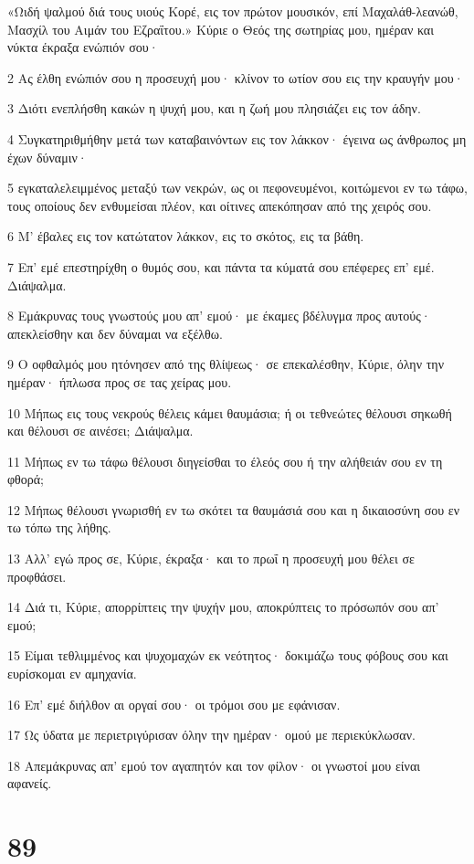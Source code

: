 \par «Ωιδή ψαλμού διά τους υιούς Κορέ, εις τον πρώτον μουσικόν, επί Μαχαλάθ-λεανώθ, Μασχίλ του Αιμάν του Εζραΐτου.» Κύριε ο Θεός της σωτηρίας μου, ημέραν και νύκτα έκραξα ενώπιόν σου·
\par 2 Ας έλθη ενώπιόν σου η προσευχή μου· κλίνον το ωτίον σου εις την κραυγήν μου·
\par 3 Διότι ενεπλήσθη κακών η ψυχή μου, και η ζωή μου πλησιάζει εις τον άδην.
\par 4 Συγκατηριθμήθην μετά των καταβαινόντων εις τον λάκκον· έγεινα ως άνθρωπος μη έχων δύναμιν·
\par 5 εγκαταλελειμμένος μεταξύ των νεκρών, ως οι πεφονευμένοι, κοιτώμενοι εν τω τάφω, τους οποίους δεν ενθυμείσαι πλέον, και οίτινες απεκόπησαν από της χειρός σου.
\par 6 Μ' έβαλες εις τον κατώτατον λάκκον, εις το σκότος, εις τα βάθη.
\par 7 Επ' εμέ επεστηρίχθη ο θυμός σου, και πάντα τα κύματά σου επέφερες επ' εμέ. Διάψαλμα.
\par 8 Εμάκρυνας τους γνωστούς μου απ' εμού· με έκαμες βδέλυγμα προς αυτούς· απεκλείσθην και δεν δύναμαι να εξέλθω.
\par 9 Ο οφθαλμός μου ητόνησεν από της θλίψεως· σε επεκαλέσθην, Κύριε, όλην την ημέραν· ήπλωσα προς σε τας χείρας μου.
\par 10 Μήπως εις τους νεκρούς θέλεις κάμει θαυμάσια; ή οι τεθνεώτες θέλουσι σηκωθή και θέλουσι σε αινέσει; Διάψαλμα.
\par 11 Μήπως εν τω τάφω θέλουσι διηγείσθαι το έλεός σου ή την αλήθειάν σου εν τη φθορά;
\par 12 Μήπως θέλουσι γνωρισθή εν τω σκότει τα θαυμάσιά σου και η δικαιοσύνη σου εν τω τόπω της λήθης.
\par 13 Αλλ' εγώ προς σε, Κύριε, έκραξα· και το πρωΐ η προσευχή μου θέλει σε προφθάσει.
\par 14 Διά τι, Κύριε, απορρίπτεις την ψυχήν μου, αποκρύπτεις το πρόσωπόν σου απ' εμού;
\par 15 Είμαι τεθλιμμένος και ψυχομαχών εκ νεότητος· δοκιμάζω τους φόβους σου και ευρίσκομαι εν αμηχανία.
\par 16 Επ' εμέ διήλθον αι οργαί σου· οι τρόμοι σου με εφάνισαν.
\par 17 Ως ύδατα με περιετριγύρισαν όλην την ημέραν· ομού με περιεκύκλωσαν.
\par 18 Απεμάκρυνας απ' εμού τον αγαπητόν και τον φίλον· οι γνωστοί μου είναι αφανείς.

\chapter{89}

